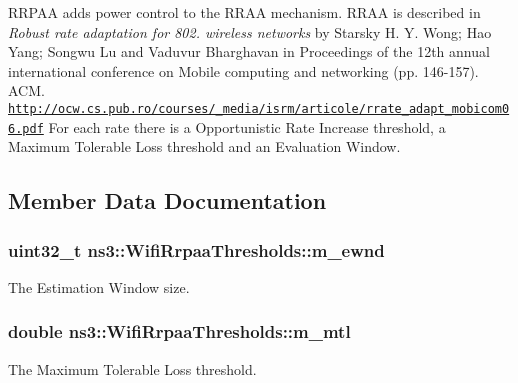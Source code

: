 R\+R\+P\+AA adds power control to the R\+R\+AA mechanism. R\+R\+AA is described in {\itshape Robust rate adaptation for 802. wireless networks} by Starsky H. Y. Wong; Hao Yang; Songwu Lu and Vaduvur Bharghavan in Proceedings of the 12th annual international conference on Mobile computing and networking (pp. 146-\/157). A\+CM. \href{http://ocw.cs.pub.ro/courses/_media/isrm/articole/rrate_adapt_mobicom06.pdf}{\tt http\+://ocw.\+cs.\+pub.\+ro/courses/\+\_\+media/isrm/articole/rrate\+\_\+adapt\+\_\+mobicom06.\+pdf} For each rate there is a Opportunistic Rate Increase threshold, a Maximum Tolerable Loss threshold and an Evaluation Window. 

\subsection{Member Data Documentation}
\subsubsection[{\texorpdfstring{m\+\_\+ewnd}{m_ewnd}}]{\setlength{\rightskip}{0pt plus 5cm}uint32\+\_\+t ns3\+::\+Wifi\+Rrpaa\+Thresholds\+::m\+\_\+ewnd}\hypertarget{structns3_1_1WifiRrpaaThresholds_a494e810bf172c14228fa4bda22af23a3}{}\label{structns3_1_1WifiRrpaaThresholds_a494e810bf172c14228fa4bda22af23a3}


The Estimation Window size. 

\subsubsection[{\texorpdfstring{m\+\_\+mtl}{m_mtl}}]{\setlength{\rightskip}{0pt plus 5cm}double ns3\+::\+Wifi\+Rrpaa\+Thresholds\+::m\+\_\+mtl}\hypertarget{structns3_1_1WifiRrpaaThresholds_ae03ff2317ee562d192df261f1ddc124b}{}\label{structns3_1_1WifiRrpaaThresholds_ae03ff2317ee562d192df261f1ddc124b}


The Maximum Tolerable Loss threshold. 

